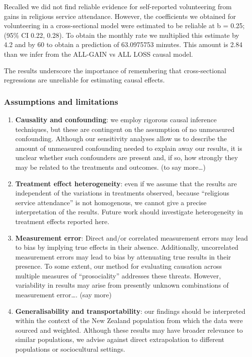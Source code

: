 \documentclass[
  single column]{article}
\begin{document}
Recalled we did not find reliable evidence for self-reported
volunteering from gains in religious service attendance. However, the
coefficients we obtained for volunteering in a cross-sectional model
were estimated to be reliable at b = 0.25; (95\% CI 0.22, 0.28). To
obtain the monthly rate we multiplied this estimate by 4.2 and by 60 to
obtain a prediction of 63.0975753 minutes. This amount is 2.84 than we
infer from the ALL-GAIN vs ALL LOSS causal model.

The results underscore the importance of remembering that
cross-sectional regressions are unreliable for estimating causal
effects.

\subsubsection{Assumptions and
limitations}\label{assumptions-and-limitations}

\begin{enumerate}
\def\labelenumi{\arabic{enumi}.}
\item
  \textbf{Causality and confounding}: we employ rigorous causal
  inference techniques, but these are contingent on the assumption of no
  unmeasured confounding. Although our sensitivity analyses allow us to
  describe the amount of unmeasured confounding needed to explain away
  our results, it is unclear whether such confounders are present and,
  if so, how strongly they may be related to the treatments and
  outcomes. (to say more\ldots)
\item
  \textbf{Treatment effect heterogeneity}: even if we assume that the
  results are independent of the variations in treatments observed,
  because ``religious service attendance'' is not homogenous, we cannot
  give a precise interpretation of the results. Future work should
  investigate heterogeneity in treatment effects reported here.
\item
  \textbf{Measurement error}: Direct and/or correlated measurement
  errors may lead to bias by implying true effects in their absence.
  Additionally, uncorrelated measurement errors may lead to bias by
  attenuating true results in their presence. To some extent, our method
  for evaluating causation across multiple measures of ``prosociality''
  addresses these threats. However, variability in results may arise
  from presently unknown combinations of measurement error\ldots. (say
  more)
\item
  \textbf{Generalisability and transportability}: our findings should be
  interpreted within the context of the New Zealand population from
  which the data were sourced and weighted. Although these results may
  have broader relevance to similar populations, we advise against
  direct extrapolation to different populations or sociocultural
  settings.
\end{enumerate}
\end{document}
